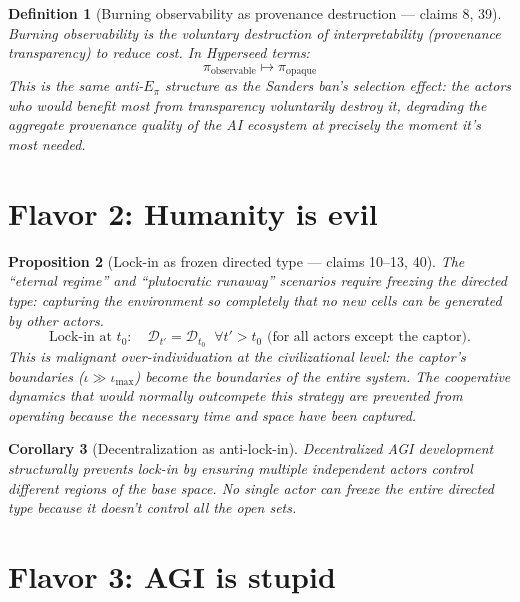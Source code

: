 \documentclass[11pt,a4paper]{article}
\newtheorem{definition}{Definition}[section]
\newtheorem{proposition}[definition]{Proposition}
\newtheorem{corollary}[definition]{Corollary}
\begin{document}
\begin{definition}[Burning observability as provenance destruction --- claims 8, 39]
\label{def:observability}
\emph{Burning observability} is the voluntary destruction of interpretability
(provenance transparency) to reduce cost. In Hyperseed terms:
\[
  \pi_{\text{observable}} \mapsto \pi_{\text{opaque}}
\]
This is the same anti-$E_\pi$ structure as the Sanders ban's selection
effect: the actors who would benefit most from transparency voluntarily
destroy it, degrading the aggregate provenance quality of the AI ecosystem
at precisely the moment it's most needed.
\end{definition}


\section{Flavor 2: Humanity is evil}
\label{sec:human-evil}

\begin{proposition}[Lock-in as frozen directed type --- claims 10--13, 40]
\label{prop:lockin}
The ``eternal regime'' and ``plutocratic runaway'' scenarios require
\emph{freezing the directed type}: capturing the environment so completely
that no new cells can be generated by other actors.
\[
  \text{Lock-in at } t_0: \quad \mathcal{D}_{t'} = \mathcal{D}_{t_0}
  \;\; \forall t' > t_0 \text{ (for all actors except the captor)}.
\]
This is malignant over-individuation at the civilizational level:
the captor's boundaries ($\iota \gg \iota_{\max}$) become the boundaries
of the entire system. The cooperative dynamics that would normally
outcompete this strategy are prevented from operating because the
necessary time and space have been captured.
\end{proposition}

\begin{corollary}[Decentralization as anti-lock-in]
Decentralized AGI development structurally prevents lock-in by ensuring
multiple independent actors control different regions of the base space.
No single actor can freeze the entire directed type because it doesn't
control all the open sets.
\end{corollary}


\section{Flavor 3: AGI is stupid}
\label{sec:agi-stupid}
\end{document}
